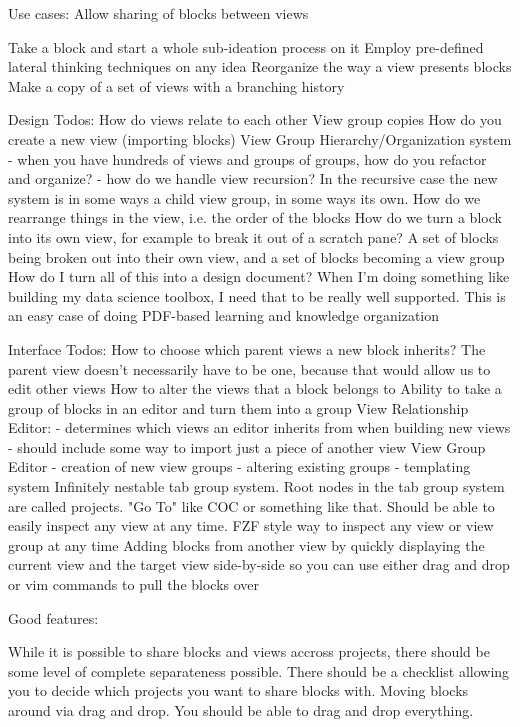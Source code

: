 Use cases:
Allow sharing of blocks between views

Take a block and start a whole sub-ideation process on it
Employ pre-defined lateral thinking techniques on any idea
Reorganize the way a view presents blocks
Make a copy of a set of views with a branching history


Design Todos:
How do views relate to each other
View group copies
How do you create a new view (importing blocks)
View Group Hierarchy/Organization system - when you have hundreds of views and groups of groups, how do you refactor and organize?
- how do we handle view recursion? In the recursive case the new system is in some ways a child view group, in some ways its own.
How do we rearrange things in the view, i.e. the order of the blocks
How do we turn a block into its own view, for example to break it out of a scratch pane? A set of blocks being broken out into their own view, and a set of blocks becoming a view group
How do I turn all of this into a design document?
When I'm doing something like building my data science toolbox, I need that to be really well supported. This is an easy case of doing PDF-based learning and knowledge organization

Interface Todos:
How to choose which parent views a new block inherits? The parent view doesn't necessarily have to be one, because that would allow us to edit other views
How to alter the views that a block belongs to
Ability to take a group of blocks in an editor and turn them into a group
View Relationship Editor:
- determines which views an editor inherits from when building new views
- should include some way to import just a piece of another view
View Group Editor
- creation of new view groups
- altering existing groups
- templating system
Infinitely nestable tab group system. Root nodes in the tab group system are called projects.
"Go To" like COC or something like that. Should be able to easily inspect any view at any time.
FZF style way to inspect any view or view group at any time
Adding blocks from another view by quickly displaying the current view and the target view side-by-side so you can use either drag and drop or vim commands to pull the blocks over

Good features:

While it is possible to share blocks and views accross projects, there should be some level of complete separateness possible. There should be a checklist allowing you to decide which projects you want to share blocks with.
Moving blocks around via drag and drop. You should be able to drag and drop everything.


